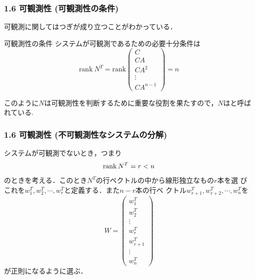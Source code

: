 \begin{frame}[t]
\frametitle{1.6 可観測性 (可観測性の条件)}
可観測に関してはつぎが成り立つことがわかっている．
\begin{block}{可観測性の条件}
システムが可観測であるための必要十分条件は
  $$\mbox{rank}\ N^T
  = \mbox{rank}
    \left(\begin{array}{c}
           C        \\
     C A      \\
     C A^2    \\
     \vdots   \\
     C A^{n-1}
    \end{array}\right)
  = n$$
\end{block}
このように$N$は可観測性を判断するために重要な役割を果たすので，$N$はと呼ばれている.
\end{frame}


\begin{frame}[t]
\frametitle{1.6 可観測性 (不可観測性なシステムの分解)}
システムが可観測でないとき，つまり
\begin{equation}
 \mathop{\rm rank}\nolimits N^T = r < n
\end{equation}
のときを考える．このとき$N^T$の行ベクトルの中から線形独立なもの$r$本を選
びこれを$w_1^T, w_2^T, \cdots, w_r^T$と定義する．また$n-r$本の行ベ
クトル$w_{r+1}^T, w_{r+2}^T, \cdots, w_n^T$を
\begin{equation}
 W = \left(\begin{array}{c}
            w_1^T \\
      w_2^T \\
      \vdots \\
      w_r^T \\
      w_{r+1}^T \\
      \vdots \\
      w_n^T
     \end{array}\right)
\end{equation}
が正則になるように選ぶ．
\end{frame}


